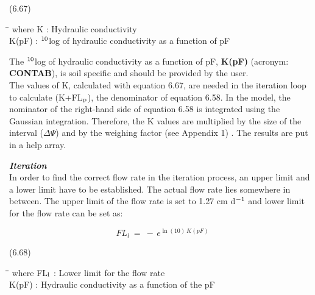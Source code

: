 \documentclass[11pt]{article}
\begin{document}
 \bigskip
\strut\hfill (6.67)
\nwln
\begin{tabbing}
\hspace{1.27cm}\=\hspace{1.27cm}\=\hspace{1.27cm}\=\hspace{1.27cm}\=%
\hspace{1.27cm}\=\hspace{1.27cm}\=\hspace{1.27cm}\=\hspace{1.27cm}\=%
\hspace{1.27cm}\=\hspace{1.27cm}\=\kill
where\> K\> : Hydraulic conductivity\> \> \> \> \> \> \> \> [cm d$^{{\rm -1}}$]\\
\>K(pF)\> : $^{{\rm 10}}$log of hydraulic conductivity as a function of pF\> \> \> \> \> \> \> \> [-]
\end{tabbing}

\bigskip
The $^{{\rm 10}}$log of hydraulic conductivity as a function of pF, {\bf K(pF)} (acronym: {\bf CONTAB}), is
soil specific and should be provided by the user.\\
The values of K, calculated with equation 6.67, are needed in the iteration loop to
calculate (K+FL$_{{\rm p}}$), the denominator of equation 6.58. In the model, the nominator of the
right-hand side of equation 6.58 is integrated using the Gaussian integration. Therefore,
the K values are multiplied by the size of the interval ($\Delta$$\Psi$) and by the weighing factor
(see Appendix 1) . The results are put in a help array.

\bigskip
\bigskip
{\bf {\it Iteration\/}}\\
In order to find the correct flow rate in the iteration process, an upper limit and a lower
limit have to be established. The actual flow rate lies somewhere in between. The upper
limit of the flow rate is set to 1.27 cm d$^{{\rm -1}}$ and lower limit for the flow rate can be set as:

\begin{displaymath}
FL _{l} ~=~ -\, e ^{\ln (10)\, K(pF)}
\end{displaymath}

 \bigskip
\strut\hfill (6.68)
\nwln
\begin{tabbing}
\hspace{1.27cm}\=\hspace{1.27cm}\=\hspace{1.27cm}\=\hspace{1.27cm}\=%
\hspace{1.27cm}\=\hspace{1.27cm}\=\hspace{1.27cm}\=\hspace{1.27cm}\=%
\hspace{1.27cm}\=\hspace{1.27cm}\=\kill
where\> FL$_{{\rm l}}$\> : Lower limit for the flow rate\> \> \> \> \> \> \> \> [cm d$^{{\rm -1}}$]\\
\>K(pF)\> : Hydraulic conductivity as a function of the pF\> \> \> \> \> \> \> \> [-]
\end{tabbing}
\end{document}
